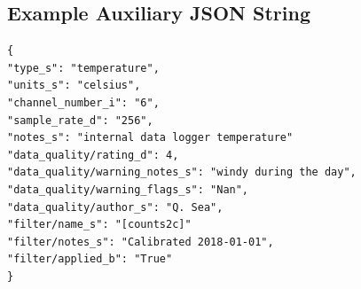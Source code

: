 \documentclass{article}
\begin{document}
\subsection{Example Auxiliary JSON String} 

\begin{verbatim}
{
"type_s": "temperature",
"units_s": "celsius",
"channel_number_i": "6",
"sample_rate_d": "256",
"notes_s": "internal data logger temperature"
"data_quality/rating_d": 4,
"data_quality/warning_notes_s": "windy during the day",
"data_quality/warning_flags_s": "Nan",
"data_quality/author_s": "Q. Sea",
"filter/name_s": "[counts2c]"
"filter/notes_s": "Calibrated 2018-01-01",
"filter/applied_b": "True"
}
\end{verbatim}
\end{document}
